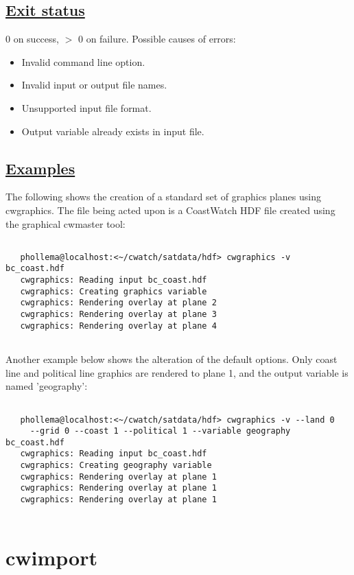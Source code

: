\subsection*{\underline{Exit status}}


  0 on success, $>$ 0 on failure. Possible causes of errors: \begin{itemize}
\item  Invalid command line option. 
\item  Invalid input or output file names. 
\item  Unsupported input file format. 
\item  Output variable already exists in input file. 

\end{itemize}

\subsection*{\underline{Examples}}


  The following shows the creation of a standard set of graphics planes using cwgraphics. The file being acted upon is a CoastWatch HDF file created using the graphical cwmaster tool: \begin{verbatim}

   phollema@localhost:<~/cwatch/satdata/hdf> cwgraphics -v bc_coast.hdf
   cwgraphics: Reading input bc_coast.hdf
   cwgraphics: Creating graphics variable
   cwgraphics: Rendering overlay at plane 2
   cwgraphics: Rendering overlay at plane 3
   cwgraphics: Rendering overlay at plane 4
 
\end{verbatim}
 Another example below shows the alteration of the default options. Only coast line and political line graphics are rendered to plane 1, and the output variable is named 'geography': \begin{verbatim}

   phollema@localhost:<~/cwatch/satdata/hdf> cwgraphics -v --land 0 
     --grid 0 --coast 1 --political 1 --variable geography bc_coast.hdf
   cwgraphics: Reading input bc_coast.hdf
   cwgraphics: Creating geography variable
   cwgraphics: Rendering overlay at plane 1
   cwgraphics: Rendering overlay at plane 1
   cwgraphics: Rendering overlay at plane 1
 
\end{verbatim}


\newpage
\section{cwimport} \hypertarget{cwimport}{}
